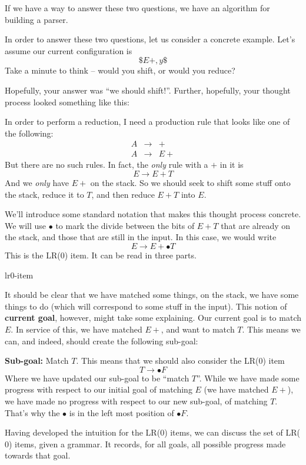 If we have a way to answer these two questions, we have an algorithm for building a parser. 

In order to answer these two questions, let us consider a concrete example. Let's assume our current configuration is
\[\$E+, y\$\]
Take a minute to think -- would you shift, or would you reduce?

Hopefully, your answer was ``we should shift!''. Further, hopefully, your thought process looked something like this:

In order to perform a reduction, I need a production rule that looks like one of the following:
\[\begin{array}{lcl}
     A & \to & +  \\
     A & \to & E+
\end{array}\]
But there are no such rules. In fact, the \textit{only} rule with a $+$ in it is
\[E \to E + T\]
And we \textit{only} have $E+$ on the stack. So we should seek to shift some stuff onto the stack, reduce it to $T$, and then reduce $E+T$ into $E$.

We'll introduce some standard notation that makes this thought process concrete. We will use $\bullet$ to mark the divide between the bits of $E + T$ that are already on the stack, and those that are still in the input. In this case, we would write
\[E \rightarrow E+ \bullet T\]
This is the LR($0$) item. It can be read in three parts.
\begin{center}
    {lr0-item}
\end{center}

It should be clear that we have matched some things, on the stack, we have some things to do (which will correspond to some stuff in the input). This notion of \textbf{current goal}, however, might take some explaining. Our current goal is to match $E$. In service of this, we have matched $E+$, and want to match $T$. This means we can, and indeed, should create the following sub-goal:

\textbf{Sub-goal:} Match $T$. This means that we should also consider the LR($0$) item
\[T \to \bullet F\]
Where we have updated our sub-goal to be ``match $T$''. While we have made some progress with respect to our initial goal of matching $E$ (we have matched $E+$), we have made no progress with respect to our new sub-goal, of matching $T$. That's why the $\bullet$ is in the left most position of $\bullet F$.

Having developed the intuition for the LR($0$) items, we can discuss the set of LR($0$) items, given a grammar. It records, for all goals, all possible progress made towards that goal.

